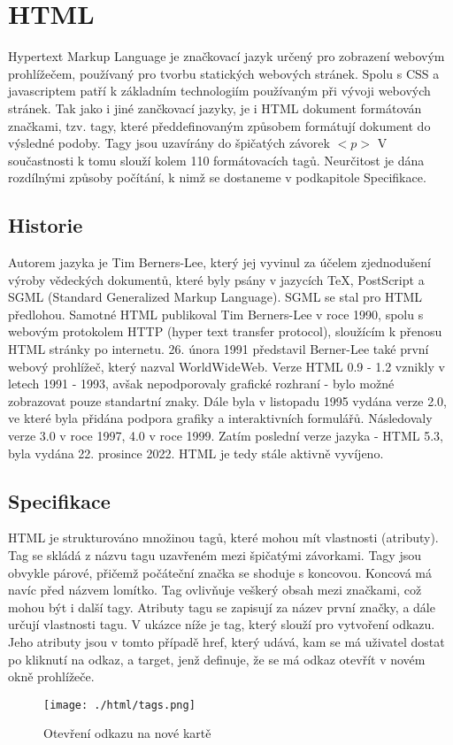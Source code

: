\documentclass[main.tex]{subfiles}
\begin{document}
\section{HTML}
Hypertext Markup Language je značkovací jazyk určený pro zobrazení webovým prohlížečem, používaný pro tvorbu statických webových stránek. Spolu s CSS a javascriptem patří k základním technologiím používaným při vývoji webových stránek. Tak jako i jiné zančkovací jazyky, je i HTML dokument formátován značkami, tzv. tagy, které předdefinovaným způsobem formátují dokument do výsledné podoby. Tagy jsou uzavírány do špičatých závorek $<p>$ \cite{web:wik:en:html} V součastnosti k tomu slouží kolem 110 formátovacích tagů. Neurčitost je dána rozdílnými způsoby počítání, k nimž se dostaneme v podkapitole Specifikace. \cite{web:en:countinghtml}


\subsection{Historie}
Autorem jazyka je Tim Berners-Lee, který jej vyvinul za účelem zjednodušení výroby vědeckých dokumentů, které byly psány v jazycích TeX, PostScript a SGML (Standard Generalized Markup Language). SGML se stal pro HTML předlohou. Samotné HTML publikoval Tim Berners-Lee v roce 1990, spolu s webovým protokolem HTTP (hyper text transfer protocol), sloužícím k přenosu HTML stránky po internetu. 26. února 1991 představil Berner-Lee také první webový prohlížeč, který nazval WorldWideWeb.
Verze HTML 0.9 - 1.2 vznikly v letech 1991 - 1993, avšak nepodporovaly grafické rozhraní - bylo možné zobrazovat pouze standartní znaky. Dále byla v listopadu 1995 vydána verze 2.0, ve které byla přidána podpora grafiky a interaktivních formulářů. Následovaly verze 3.0 v roce 1997, 4.0 v roce 1999. Zatím poslední verze jazyka - HTML 5.3, byla vydána 22. prosince 2022. HTML je tedy stále aktivně vyvíjeno. \cite{web:wik:en:html}


\subsection{Specifikace}
HTML je strukturováno množinou tagů, které mohou mít vlastnosti (atributy). Tag se skládá z názvu tagu uzavřeném mezi špičatými závorkami. Tagy jsou obvykle párové, přičemž počáteční značka se shoduje s koncovou. Koncová má navíc před názvem lomítko. Tag ovlivňuje veškerý obsah mezi značkami, což mohou být i další tagy. Atributy tagu se zapisují za název první značky, a dále určují vlastnosti tagu. V ukázce níže je tag, který slouží pro vytvoření odkazu. Jeho atributy jsou v tomto případě href, který udává, kam se má uživatel dostat po kliknutí na odkaz, a target, jenž definuje, že se má odkaz otevřít v novém okně prohlížeče.\cite{web:wik:en:html}
		\begin{figure}[h]
			\centering
			\texttt{[image: ./html/tags.png]}
			\caption{Otevření odkazu na nové kartě}
		\end{figure}
\end{document}
